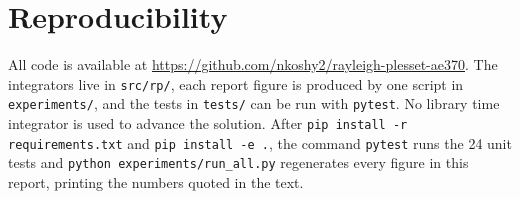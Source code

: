 \section{Reproducibility}\label{sec:reproducibility}

All code is available at \url{https://github.com/nkoshy2/rayleigh-plesset-ae370}.
The integrators live in \texttt{src/rp/}, each report figure is produced by one script in
\texttt{experiments/}, and the tests in \texttt{tests/} can be run with \texttt{pytest}.
No library time integrator is used to advance the solution.
After \texttt{pip install -r requirements.txt} and \texttt{pip install -e .},
the command \texttt{pytest} runs the 24 unit tests and
\texttt{python experiments/run\_all.py} regenerates every figure in this report,
printing the numbers quoted in the text.
